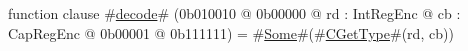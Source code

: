 function clause #\hyperref[sailMIPSzdecode]{decode}# (0b010010 @ 0b00000 @ rd : IntRegEnc @ cb : CapRegEnc @    0b00001 @ 0b111111) = #\hyperref[sailMIPSzSome]{Some}#(#\hyperref[sailMIPSzCGetType]{CGetType}#(rd, cb))
